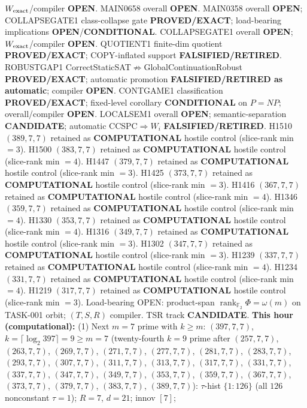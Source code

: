 \documentclass[11pt]{article}
\begin{document}
$W_{\rm exact}$/compiler \textbf{OPEN}.
MAIN0658 overall \textbf{OPEN}.
MAIN0358 overall \textbf{OPEN}; COLLAPSEGATE1 class-collapse gate \textbf{PROVED/EXACT};
load-bearing implications \textbf{OPEN}/\textbf{CONDITIONAL}.
COLLAPSEGATE1 overall \textbf{OPEN}; $W_{\rm exact}$/compiler \textbf{OPEN}.
QUOTIENT1 finite-dim quotient \textbf{PROVED/EXACT}; COPY-inflated support \textbf{FALSIFIED/RETIRED}.
ROBUSTGAP1 CorrectStaticSAT$\not\Rightarrow$GlobalContinuationRobust \textbf{PROVED/EXACT};
automatic promotion \textbf{FALSIFIED/RETIRED as automatic}; compiler \textbf{OPEN}.
CONTGAME1 classification \textbf{PROVED/EXACT}; fixed-level corollary \textbf{CONDITIONAL} on $P=NP$;
overall/compiler \textbf{OPEN}.
LOCALSEM1 overall \textbf{OPEN}; semantic-separation \textbf{CANDIDATE}; automatic CCSPC$\Rightarrow W_i$
\textbf{FALSIFIED/RETIRED}.
H1510 $(389,7,7)$ retained as \textbf{COMPUTATIONAL} hostile control (slice-rank min $=3$).
H1500 $(383,7,7)$ retained as \textbf{COMPUTATIONAL} hostile control (slice-rank min $=4$).
H1447 $(379,7,7)$ retained as \textbf{COMPUTATIONAL} hostile control (slice-rank min $=3$).
H1425 $(373,7,7)$ retained as \textbf{COMPUTATIONAL} hostile control (slice-rank min $=3$).
H1416 $(367,7,7)$ retained as \textbf{COMPUTATIONAL} hostile control (slice-rank min $=4$).
H1346 $(359,7,7)$ retained as \textbf{COMPUTATIONAL} hostile control (slice-rank min $=4$).
H1330 $(353,7,7)$ retained as \textbf{COMPUTATIONAL} hostile control (slice-rank min $=4$).
H1316 $(349,7,7)$ retained as \textbf{COMPUTATIONAL} hostile control (slice-rank min $=3$).
H1302 $(347,7,7)$ retained as \textbf{COMPUTATIONAL} hostile control (slice-rank min $=3$).
H1239 $(337,7,7)$ retained as \textbf{COMPUTATIONAL} hostile control (slice-rank min $=4$).
H1234 $(331,7,7)$ retained as \textbf{COMPUTATIONAL} hostile control (slice-rank min $=4$).
H1219 $(317,7,7)$ retained as \textbf{COMPUTATIONAL} hostile control (slice-rank min $=3$).
Load-bearing OPEN: product-span $\operatorname{rank}_{\mathbb F_2}\Phi=\omega(m)$ on TASK-001 orbit;
$(T,S,R)$ compiler. TSR track \textbf{CANDIDATE}.
\textbf{This hour (computational):}
(1) Next $m{=}7$ prime with $k{\ge}m$: $(397,7,7)$, $k{=}\lceil\log_2 397\rceil=9{\ge}m{=}7$
(twenty-fourth $k{=}9$ prime after $(257,7,7)$, $(263,7,7)$, $(269,7,7)$, $(271,7,7)$, $(277,7,7)$, $(281,7,7)$, $(283,7,7)$, $(293,7,7)$, $(307,7,7)$, $(311,7,7)$, $(313,7,7)$, $(317,7,7)$, $(331,7,7)$, $(337,7,7)$, $(347,7,7)$, $(349,7,7)$, $(353,7,7)$, $(359,7,7)$, $(367,7,7)$, $(373,7,7)$, $(379,7,7)$, $(383,7,7)$, $(389,7,7)$):
$\tau$-hist $\{1{:}126\}$ (all $126$ nonconstant $\tau{=}1$); $R{=}7$, $d{=}21$; innov $[7]$;
\end{document}
